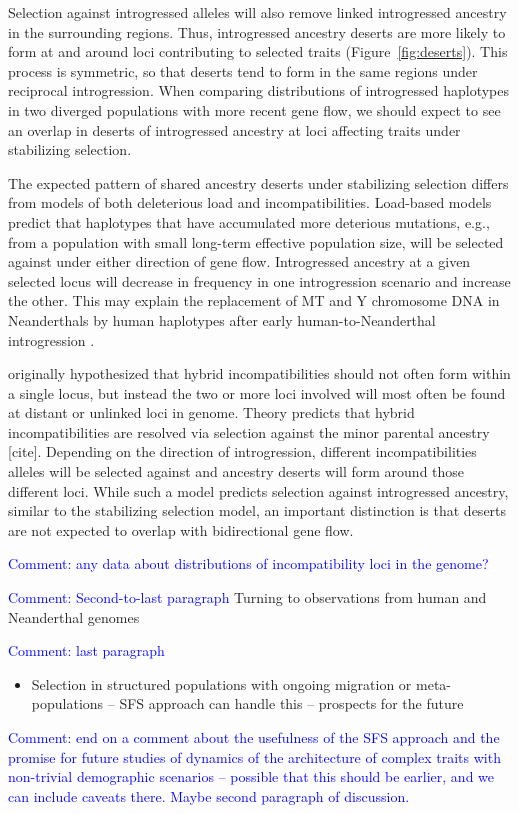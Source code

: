 \documentclass{article}
\newcommand{\aprcomment}[1]{{\textcolor{blue}{Comment: #1}}}
\begin{document}
Selection against introgressed alleles will also remove linked introgressed
ancestry in the surrounding regions. Thus, introgressed ancestry deserts are
more likely to form at and around loci contributing to selected traits
(Figure~\ref{fig:deserts}). This process is symmetric, so that deserts tend to
form in the same regions under reciprocal introgression. When comparing
distributions of introgressed haplotypes in two diverged populations with more
recent gene flow, we should expect to see an overlap in deserts of introgressed
ancestry at loci affecting traits under stabilizing selection.

The expected pattern of shared ancestry deserts under stabilizing selection
differs from models of both deleterious load and incompatibilities. Load-based
models predict that haplotypes that have accumulated more deterious mutations,
e.g., from a population with small long-term effective population size, will be
selected against under either direction of gene flow. Introgressed ancestry at
a given selected locus will decrease in frequency in one introgression scenario
and increase the other. This may explain the replacement of MT and Y chromosome
DNA in Neanderthals by human haplotypes after early human-to-Neanderthal
introgression \citep{posth2017deeply,petr2020evolutionary}.

\citet{muller1942isolating} originally hypothesized that hybrid
incompatibilities should not often form within a single locus, but instead the
two or more loci involved will most often be found at distant or unlinked loci
in genome. Theory predicts that hybrid incompatibilities are resolved via
selection against the minor parental ancestry [cite]. Depending on the
direction of introgression, different incompatibilities alleles will be
selected against and ancestry deserts will form around those different loci.
While such a model predicts selection against introgressed ancestry, similar to
the stabilizing selection model, an important distinction is that deserts are
not expected to overlap with bidirectional gene flow.

\aprcomment{any data about distributions of incompatibility loci in the
genome?}

\aprcomment{Second-to-last paragraph}
Turning to observations from human and Neanderthal genomes
\citep{harris2023diverse}

\aprcomment{last paragraph}
\begin{itemize}
    \item Selection in structured populations with ongoing migration or
        meta-populations -- SFS approach can handle this -- prospects for the
        future
\end{itemize}
\aprcomment{end on a comment about the usefulness of the SFS approach and the
promise for future studies of dynamics of the architecture of complex traits
with non-trivial demographic scenarios -- possible that this should be earlier,
and we can include caveats there. Maybe second paragraph of discussion.}
\end{document}
